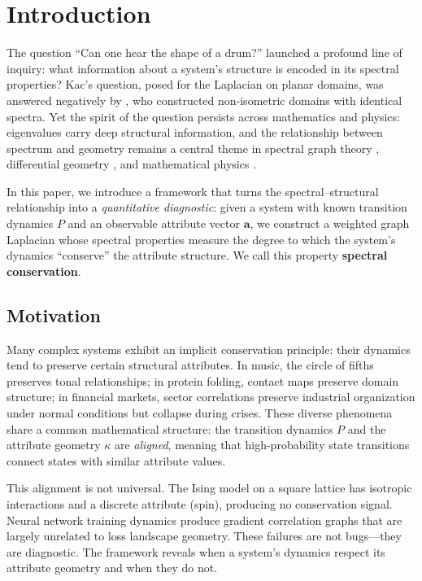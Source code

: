 \documentclass[12pt,letterpaper]{article}
\newcommand{\bfa}{\mathbf{a}}
\begin{document}
\newpage
\tableofcontents
\newpage

\section{Introduction}
\label{sec:intro}

The question ``Can one hear the shape of a drum?'' \citep{kac1966} launched a profound line of inquiry: what information about a system's structure is encoded in its spectral properties? Kac's question, posed for the Laplacian on planar domains, was answered negatively by \citet{gordon1992}, who constructed non-isometric domains with identical spectra. Yet the spirit of the question persists across mathematics and physics: eigenvalues carry deep structural information, and the relationship between spectrum and geometry remains a central theme in spectral graph theory \citep{chung1997}, differential geometry \citep{berger2003}, and mathematical physics \citep{reed1978}.

In this paper, we introduce a framework that turns the spectral--structural relationship into a \emph{quantitative diagnostic}: given a system with known transition dynamics $P$ and an observable attribute vector $\bfa$, we construct a weighted graph Laplacian whose spectral properties measure the degree to which the system's dynamics ``conserve'' the attribute structure. We call this property \textbf{spectral conservation}.

\subsection{Motivation}

Many complex systems exhibit an implicit conservation principle: their dynamics tend to preserve certain structural attributes. In music, the circle of fifths preserves tonal relationships; in protein folding, contact maps preserve domain structure; in financial markets, sector correlations preserve industrial organization under normal conditions but collapse during crises. These diverse phenomena share a common mathematical structure: the transition dynamics $P$ and the attribute geometry $\kappa$ are \emph{aligned}, meaning that high-probability state transitions connect states with similar attribute values.

This alignment is not universal. The Ising model on a square lattice has isotropic interactions and a discrete attribute (spin), producing no conservation signal. Neural network training dynamics produce gradient correlation graphs that are largely unrelated to loss landscape geometry. These failures are not bugs---they are diagnostic. The framework reveals when a system's dynamics respect its attribute geometry and when they do not.
\end{document}
